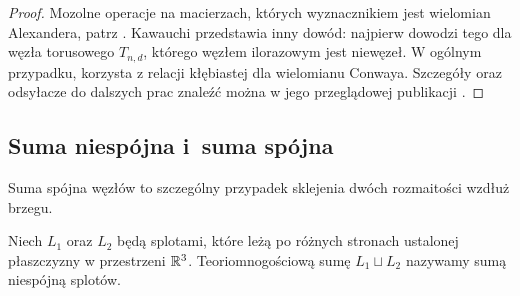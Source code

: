 \begin{proof}
    Mozolne operacje na macierzach, których wyznacznikiem jest wielomian Alexandera, patrz \cite{murasugi71}.
    Kawauchi przedstawia inny dowód: najpierw dowodzi tego dla węzła torusowego $T_{n, d}$, którego węzłem ilorazowym jest niewęzeł.
    W ogólnym przypadku, korzysta z relacji kłębiastej dla wielomianu Conwaya.
    Szczegóły oraz odsyłacze do dalszych prac znaleźć można w jego przeglądowej publikacji \cite[s. 122-124]{kawauchi96}.
\end{proof}


\subsection{Suma niespójna i~suma spójna} %

Suma spójna węzłów to szczególny przypadek sklejenia dwóch rozmaitości wzdłuż brzegu.

\begin{definition}
    Niech $L_1$ oraz $L_2$ będą splotami, które leżą po różnych stronach ustalonej płaszczyzny w przestrzeni $\mathbb R^3$.
    Teoriomnogościową sumę $L_1 \sqcup L_2$ nazywamy sumą niespójną splotów.
\end{definition}

